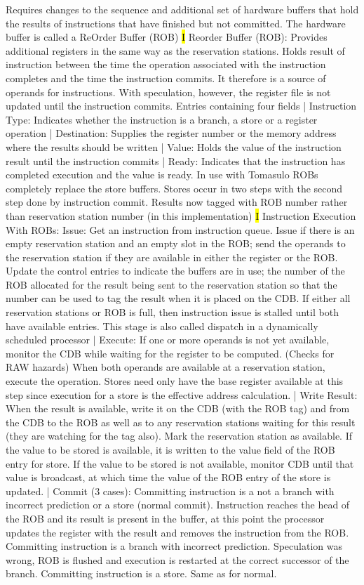 \documentclass[fontsize=4pt]{scrartcl}
\begin{document}
Requires changes to the sequence and additional set of hardware buffers that hold the results of instructions that have finished but not committed. The hardware buffer is called a ReOrder Buffer (ROB)
\hl{I}
Reorder Buffer (ROB): Provides additional registers in the same way as the reservation stations. Holds result of instruction between the time the operation associated with the instruction completes and the time the instruction commits. It therefore is a source of operands for instructions. With speculation, however, the register file is not updated until the instruction commits. Entries containing four fields | Instruction Type: Indicates whether the instruction is a branch, a store or a register operation | Destination: Supplies the register number or the memory address where the results should be written | Value: Holds the value of the instruction result until the instruction commits | Ready: Indicates that the instruction has completed execution and the value is ready. In use with Tomasulo ROBs completely replace the store buffers. Stores occur in two steps with the second step done by instruction commit. Results now tagged with ROB number rather than reservation station number (in this implementation)
\hl{I}
Instruction Execution With ROBs: Issue:  Get an instruction from instruction queue.  Issue if there is an empty reservation station and an empty slot in the ROB; send the operands to the reservation station if they are available in either the register or the ROB.  Update the control entries to indicate the buffers are in use; the number of the ROB allocated for the result being sent to the reservation station so that the number can be used to tag the result when it is placed on the CDB. If either all reservation stations or ROB is full, then instruction issue is stalled until both have available entries.  This stage is also called dispatch in a dynamically scheduled processor | Execute: If one or more operands is not yet available, monitor the CDB while waiting for the register to be computed. (Checks for RAW hazards) When both operands are available at a reservation station, execute the operation. Stores need only have the base register available at this step since execution for a store is the effective address calculation. | Write Result: When the result is available, write it on the CDB (with the ROB tag) and from the CDB to the ROB as well as to any reservation stations waiting for this result (they are watching for the tag also). Mark the reservation station as available. If the value to be stored is available, it is written to the value field of the ROB entry for store. If the value to be stored is not available, monitor CDB until that value is broadcast, at which time the value of the ROB entry of the store is updated. | Commit (3 cases): Committing instruction is a not a branch with incorrect prediction or a store (normal commit). Instruction reaches the head of the ROB and its result is present in the buffer, at this point the processor updates the register with the result and removes the instruction from the ROB. Committing instruction is a branch with incorrect prediction. Speculation was wrong, ROB is flushed and execution is restarted at the correct successor of the branch. Committing instruction is a store. Same as for normal.
\end{document}
